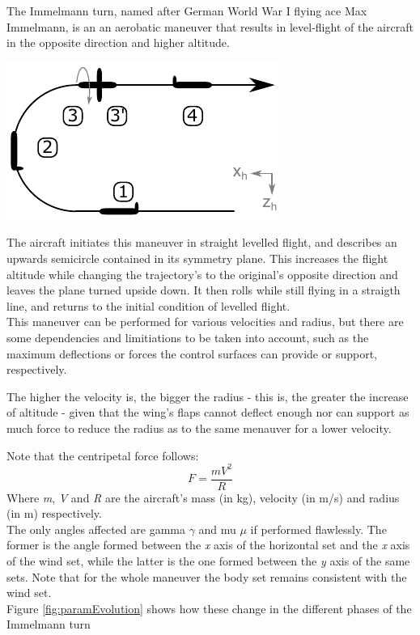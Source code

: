 \vspace{-0.5cm}
The Immelmann turn, named after German World War I flying ace Max Immelmann, is an an  aerobatic maneuver that results in level-flight of the aircraft in the opposite direction and higher altitude.

\includegraphics[width=\linewidth]{figures/immelmann-overview}
\label{fig:immelmann-overview}
\vspace*{0.5cm}

The aircraft initiates this maneuver in straight levelled flight, and describes an upwards semicircle contained in its symmetry plane. This increases the flight altitude while changing the trajectory's to the original's opposite direction and leaves the plane turned upside down. It then rolls while still flying in a straigth line, and returns to the initial condition of levelled flight.\\

This maneuver can be performed for various velocities and radius, but there are some dependencies and limitiations to be taken into account, such as the maximum deflections or forces the control surfaces can provide or support, respectively. 

The higher the velocity is, the bigger the radius - this is, the greater the increase of altitude - given that the wing's flaps cannot deflect enough nor can support as much force to reduce the radius as to the same menauver for a lower velocity.

Note that the centripetal force follows:
\[
	F=\frac{mV^2}{R}
\]
Where \textit{m}, \textit{V} and \textit{R} are the aircraft's mass (in kg), velocity (in m/s) and radius (in m) respectively. \\

The only angles affected are gamma $\gamma$ and mu $\mu$ if performed flawlessly. The former is the angle formed between the \textit{x} axis of the horizontal set and the \textit{x} axis of the wind set, while the latter is the one formed between the \textit{y} axis of the same sets. Note that for the whole maneuver the body set remains consistent with the wind set.\\
Figure \ref{fig:paramEvolution} shows how these change in the different phases of the Immelmann turn\\

